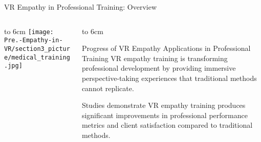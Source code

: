 \documentclass[aspectratio=169,xcolor=dvipsnames]{beamer}
\begin{document}
\begin{frame}{VR Empathy in Professional Training: Overview}
    \begin{columns}[T]
        \begin{column}{0.45\textwidth}
            \vbox to 6cm{
                \vfill
                \centering
                \texttt{[image: Pre.-Empathy-in-VR/section3\_picture/medical\_training.jpg]}
                \vfill
            }
        \end{column}
        
        \begin{column}{0.55\textwidth}
            \vbox to 6cm{
                \vfill
                \begin{block}{Progress of VR Empathy Applications in Professional Training}
                    VR empathy training is transforming professional development by providing immersive perspective-taking experiences that traditional methods cannot replicate.
                    
                    Studies demonstrate VR empathy training produces significant improvements in professional performance metrics and client satisfaction compared to traditional methods.
                \end{block}
                \vfill
            }
        \end{column}
    \end{columns}
\end{frame}
\end{document}
